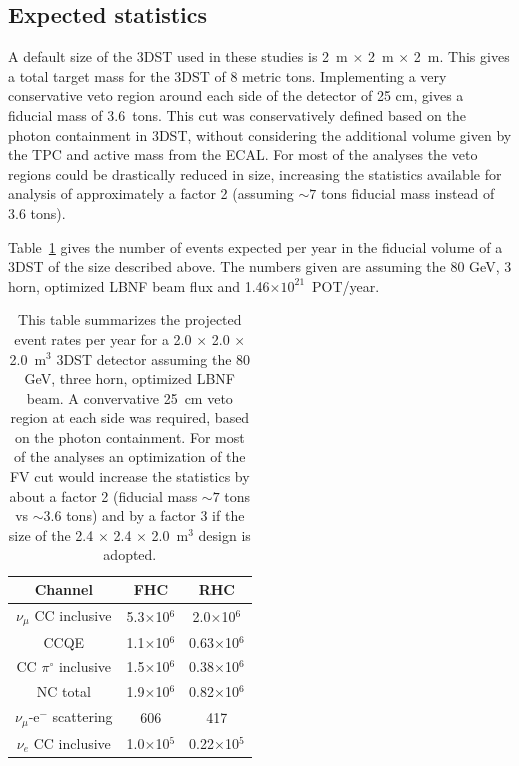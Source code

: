 \subsection{Expected statistics}

A default size of the 3DST used in these studies is 2~m $\times$ 2~m $\times$ 2~m. This gives a total target mass for the 3DST of 8 metric tons.  Implementing a very conservative veto region around each side of the detector of 25 cm, gives a fiducial mass of 3.6~tons.  
This cut was conservatively defined based on the photon containment in 3DST, without considering the additional volume given by the TPC and active mass from the ECAL.
For most of the analyses the veto regions could be drastically reduced in size, increasing the statistics available for analysis of approximately a factor 2 (assuming $\sim 7$ tons fiducial mass instead of 3.6 tons).

Table~\ref{tab:stats} gives the number of events expected per year in the fiducial volume of a 3DST of the size described above.  The numbers given are assuming the 80 GeV, 3 horn, optimized LBNF beam flux and 1.46$\times10^{21}$~POT/year.

\begin{table}
\begin{center}
\begin{tabular}{| c | c | c |}
\hline
Channel & FHC & RHC \\
\hline
$\nu_{\mu}$ CC inclusive & 5.3$\times$10$^{6}$ & 2.0$\times$10$^{6}$ \\ 
CCQE & 1.1$\times$10$^{6}$ & 0.63$\times$10$^{6}$ \\
CC $\pi^{\circ}$ inclusive & 1.5$\times$10$^{6}$ & 0.38$\times$10$^{6}$ \\
NC total & 1.9$\times$10$^{6}$ & 0.82$\times$10$^{6}$ \\
$\nu_{\mu}$-e$^{-}$ scattering & 606 & 417 \\
$\nu_{e}$ CC inclusive & 1.0$\times$10$^{5}$ & 0.22$\times$10$^{5}$ \\
 \hline
\end{tabular}
\end{center}
\caption{\label{tab:stats} This table summarizes the projected event rates per year for a 2.0 $\times$ 2.0 $\times$ 2.0~m$^{3}$ 3DST detector assuming the 80 GeV, three horn, optimized LBNF beam. A convervative 25~cm veto region at each side was required, based on the photon containment. 
For most of the analyses an optimization of the FV cut would increase the statistics by about a factor 2 (fiducial mass $\sim 7$ tons vs $\sim 3.6$ tons) and by a factor 3 if the size of the 2.4 $\times$ 2.4 $\times$ 2.0~m$^{3}$ design is adopted. 
}
\end{table}

